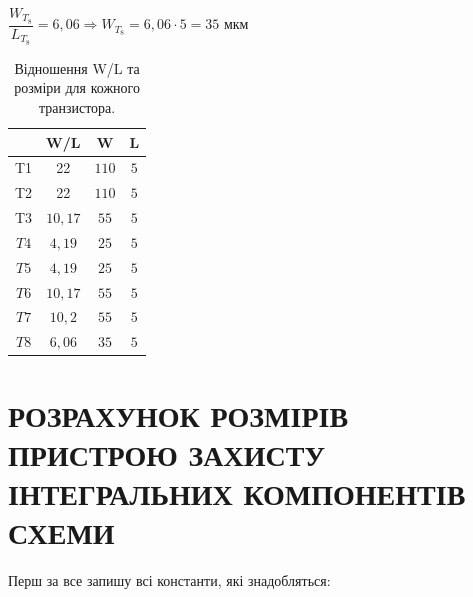 \documentclass[a4paper,14pt]{extreport}
\begin{document}

	$ \dfrac{W_{T_{8}}}{L_{T_{8}}} =6,06 \Rightarrow {W_{T_{8}}} = 6,06 \cdot 5 = 35 $ мкм






	\begin{table}[h!]
	\begin{center}
	\caption{Відношення W/L та розміри для кожного транзистора.}
	\begin{tabular}{|c|c|c|c|}

	\hline             & W/L         & W           & L \\
	\hline   T1        & 22          & $1 1 0$     & $5$ \\
	\hline   T2        & 22          & $1 1 0$     & $5$ \\
	\hline   T3        & $10,17$     & $55$       & $5$ \\
	\hline   $T4$      & $4,19$      & $25$       & $5$ \\
	\hline   $T5$      & $4,19$      & $25$       & $5$ \\
	\hline   $T6$      & $10,17$     & $55$       & $5$ \\
	\hline   $T7$      & $10,2$      & $55$         & $5$ \\
	\hline   $T8$      & $6,06$      & $3 5$       & $5$ \\
	\hline
	\end{tabular}
	\end{center}
	\end{table}


\newpage
\chapter{РОЗРАХУНОК РОЗМІРІВ ПРИСТРОЮ ЗАХИСТУ ІНТЕГРАЛЬНИХ КОМПОНЕНТІВ СХЕМИ }
	Перш за все запишу всі константи, які знадобляться:\\
\end{document}
